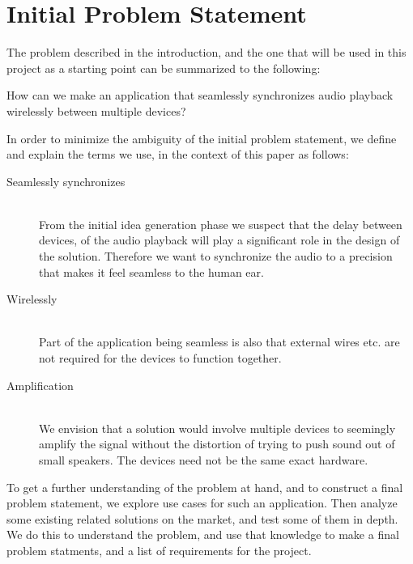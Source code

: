 \section{Initial Problem Statement}\label{sec:initial_problem}

The problem described in the introduction, and the one that will be used
in this project as a starting point can be summarized to the following:

\begin{problemstatement}
    How can we make an application that seamlessly synchronizes audio
    playback wirelessly between multiple devices?
\end{problemstatement}

\noindent
In order to minimize the ambiguity of the initial problem statement, 
we define and explain the terms we use, in the context of this paper as follows:

\begin{description}
    \item[Seamlessly synchronizes]  \hfill \\
        From the initial idea generation phase we suspect
        that the delay between devices, of the audio playback will
        play a significant role in the design of the solution. Therefore we
        want to synchronize the audio to a precision that makes it feel
        seamless to the human ear.
    \item[Wirelessly]  \hfill \\
        Part of the application being seamless is also that external wires etc. are
        not required for the devices to function together.
    \item[Amplification]  \hfill \\
        We envision that a solution would involve multiple devices to seemingly 
        amplify the signal without the distortion of trying to push sound out of
        small speakers. The devices need not be the same exact hardware.
\end{description}

To get a further understanding of the problem at hand, and to
construct a final problem statement, we explore use
cases for such an application. 
Then analyze some existing related solutions on the market, 
and test some of them in depth. 
We do this to understand the problem, and use that knowledge
to make a final problem statments, and a list of requirements for the project. 
